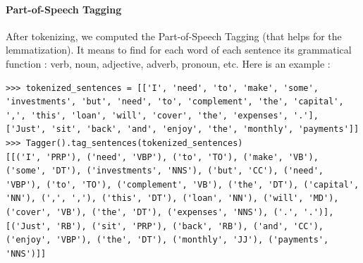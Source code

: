 		\paragraph{Part-of-Speech Tagging}
			After tokenizing, we computed the Part-of-Speech Tagging (that helps for the lemmatization). It means to find for each word of each sentence its grammatical function : verb, noun, adjective, adverb, pronoun, etc. Here is an example :
			\begin{verbatim}
>>> tokenized_sentences = [['I', 'need', 'to', 'make', 'some', 'investments', 'but', 'need', 'to', 'complement', 'the', 'capital', ',', 'this', 'loan', 'will', 'cover', 'the', 'expenses', '.'], ['Just', 'sit', 'back', 'and', 'enjoy', 'the', 'monthly', 'payments']]
>>> Tagger().tag_sentences(tokenized_sentences)
[[('I', 'PRP'), ('need', 'VBP'), ('to', 'TO'), ('make', 'VB'), ('some', 'DT'), ('investments', 'NNS'), ('but', 'CC'), ('need', 'VBP'), ('to', 'TO'), ('complement', 'VB'), ('the', 'DT'), ('capital', 'NN'), (',', ','), ('this', 'DT'), ('loan', 'NN'), ('will', 'MD'), ('cover', 'VB'), ('the', 'DT'), ('expenses', 'NNS'), ('.', '.')], [('Just', 'RB'), ('sit', 'PRP'), ('back', 'RB'), ('and', 'CC'), ('enjoy', 'VBP'), ('the', 'DT'), ('monthly', 'JJ'), ('payments', 'NNS')]]
			\end{verbatim}

